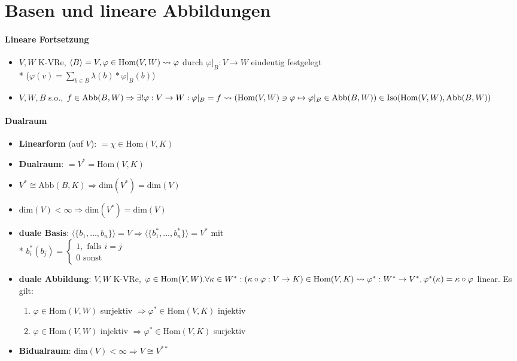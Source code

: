 \section{\label{sec:BasenLinAbb}Basen und lineare Abbildungen}

\paragraph{Lineare Fortsetzung}
\begin{itemize}
	\item $V, W$ K-VRe, $\langle B \rangle = V, \varphi \in \text{Hom}(V,W) \\* \leadsto \varphi$ durch $\varphi|_B: V \rightarrow W$ eindeutig festgelegt \\* ($\varphi(v)=\sum_{b \in B} \lambda(b) * \varphi|_B(b) $)
	\item $V, W, B$ s.o., $f \in \text{Abb}(B,W) \Rightarrow \exists ! \varphi: V \rightarrow W: \varphi|_B = f \\* \leadsto (\text{Hom}(V,W) \ni \varphi \mapsto \varphi|_B \in \text{Abb}(B,W)) \\* \in \text{Iso}(\text{Hom}(V,W), \text{Abb}(B,W))$
\end{itemize}

\paragraph{Dualraum}
\begin{itemize}
	\item \textbf{Linearform} (auf $V$): $= \chi \in \text{Hom}(V,K)$
	\item \textbf{Dualraum}: $=V^{*} = \text{Hom}(V,K)$
	\item $V^{*} \cong \text{Abb}(B,K) \Rightarrow \text{dim}(V^{*})=\text{dim}(V)$
	\item $\text{dim}(V) < \infty \Rightarrow \text{dim}(V^{*})=\text{dim}(V)$
	\item \textbf{duale Basis}: $\langle \{ b_1, \dots, b_n \} \rangle = V \Rightarrow \langle \{ b_1^*, \dots, b_n^* \} \rangle = V^*$ mit \\* $b_i^*(b_j)=\begin{cases} 1, \text{ falls } i=j \\ 0 \text{ sonst} \end{cases}$
	\item \textbf{duale Abbildung}: $V,W$ K-VRe, $\varphi \in \text{Hom}(V,W). \\* \forall \kappa \in W^*: (\kappa \circ \varphi: V \rightarrow K) \in \text{Hom}(V,K) \\* \leadsto \varphi^*: W^* \rightarrow V^*, \varphi^*(\kappa)=\kappa \circ \varphi$ linear. Es gilt:
	\begin{enumerate}
		\item $\varphi \in \text{Hom}(V,W)$ surjektiv $\Rightarrow \varphi^* \in \text{Hom}(V,K)$ injektiv
		\item $\varphi \in \text{Hom}(V,W)$ injektiv $\Rightarrow \varphi^* \in \text{Hom}(V,K)$ surjektiv
	\end{enumerate}
	\item \textbf{Bidualraum}: $\text{dim}(V) < \infty \Rightarrow V \cong V^{**}$
\end{itemize}

